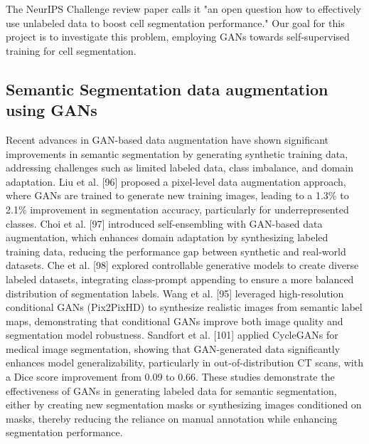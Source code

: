 \documentclass[]{article}
\begin{document}
The NeurIPS Challenge review paper \cite{NeurIPS-CellSeg} calls it "an open
question how to effectively use unlabeled data to boost cell segmentation performance." Our goal for this project is to investigate this problem, employing GANs towards self-supervised training for cell segmentation.

\subsection{Semantic Segmentation data augmentation using GANs}
Recent advances in GAN-based data augmentation have shown significant improvements in semantic segmentation by generating synthetic training data, addressing challenges such as limited labeled data, class imbalance, and domain adaptation. Liu et al. [96] proposed a pixel-level data augmentation approach, where GANs are trained to generate new training images, leading to a 1.3\% to 2.1\% improvement in segmentation accuracy, particularly for underrepresented classes. Choi et al. [97] introduced self-ensembling with GAN-based data augmentation, which enhances domain adaptation by synthesizing labeled training data, reducing the performance gap between synthetic and real-world datasets. Che et al. [98] explored controllable generative models to create diverse labeled datasets, integrating class-prompt appending to ensure a more balanced distribution of segmentation labels. Wang et al. [95] leveraged high-resolution conditional GANs (Pix2PixHD) to synthesize realistic images from semantic label maps, demonstrating that conditional GANs improve both image quality and segmentation model robustness. Sandfort et al. [101] applied CycleGANs for medical image segmentation, showing that GAN-generated data significantly enhances model generalizability, particularly in out-of-distribution CT scans, with a Dice score improvement from 0.09 to 0.66. These studies demonstrate the effectiveness of GANs in generating labeled data for semantic segmentation, either by creating new segmentation masks or synthesizing images conditioned on masks, thereby reducing the reliance on manual annotation while enhancing segmentation performance.
\end{document}
